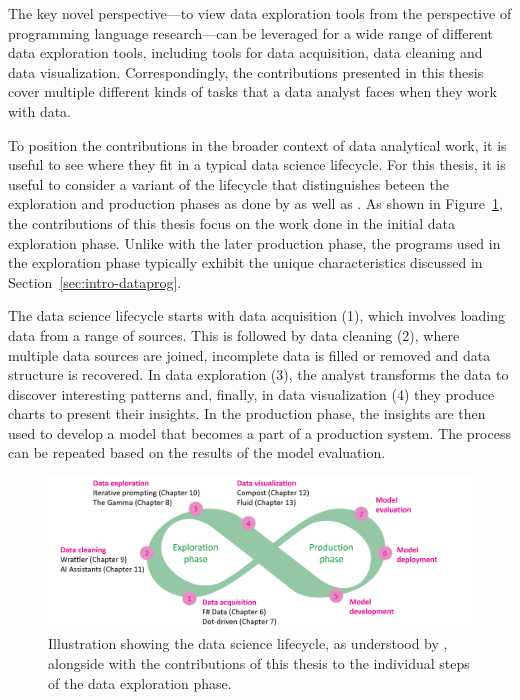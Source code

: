 \documentclass[fleqn,11pt]{report}
\theoremstyle{definition}
\begin{document}
The key novel perspective---to view data exploration tools from the perspective of programming
language research---can be leveraged for a wide range of different data exploration tools,
including tools for data acquisition, data cleaning and data visualization. Correspondingly,
the contributions presented in this thesis cover multiple different kinds of tasks that a data
analyst faces when they work with data.

To position the contributions in the broader context of data analytical work, it is useful to
see where they fit in a typical data science lifecycle. For this thesis, it is useful to consider
a variant of the lifecycle that distinguishes beteen the exploration and production phases as done
by \cite{jain-2022-survey} as well as \cite{ibm-2020-lifecycle}. As shown in
Figure~\ref{fig:lifecycle}, the contributions of this thesis focus on the work done in the initial
data exploration phase. Unlike with the later production phase, the programs used in the exploration
phase typically exhibit the unique characteristics discussed in Section~\ref{sec:intro-dataprog}.

The data science lifecycle starts with data acquisition (1), which involves loading
data from a range of sources. This is followed by data cleaning (2), where multiple data sources
are joined, incomplete data is filled or removed and data structure is recovered.
In data exploration (3), the analyst transforms the data to discover
interesting patterns and, finally, in data visualization (4) they produce charts to present
their insights. In the production phase, the insights are then used to develop a model
that becomes a part of a production system. The process can be repeated based on the results
of the model evaluation.


\begin{figure}[t]
  \vspace{1em}
  \includegraphics[scale=0.2]{img/lifecycle.png}
  \vspace{-1em}
  \caption{Illustration showing the data science lifecycle, as understood by ,
  alongside with the contributions of this thesis to the individual steps of the data exploration phase.}
  \label{fig:lifecycle}
\end{figure}
\end{document}
